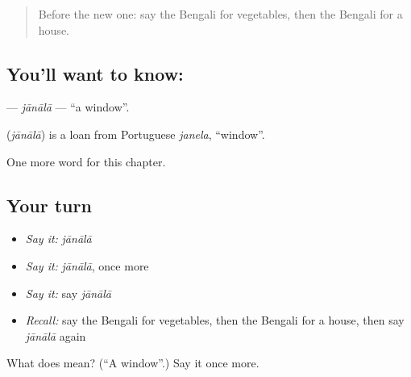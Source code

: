 \label{lesson:BN-C59-janala}



\begin{quote}
Before the new one: say the Bengali for vegetables, then the Bengali for a house.
\end{quote}

\subsection*{You'll want to know: }
\textbf{} — \emph{jānālā} — \textquotedblleft{}a window\textquotedblright{}.

\begin{cousinweb}
\textbf{} (\emph{jānālā}) is a loan from Portuguese \emph{janela}, \textquotedblleft{}window\textquotedblright{}.
\end{cousinweb}

\begin{grammarlens}[title={What you've built}]
One more word for this chapter.
\end{grammarlens}

\subsection*{Your turn}
\begin{itemize}
\raggedright
  \item \emph{Say it:} \emph{jānālā}
  \item \emph{Say it:} \emph{jānālā}, once more
  \item \emph{Say it:} say \emph{jānālā}
  \item \emph{Recall:} say the Bengali for vegetables, then the Bengali for a house, then say \emph{jānālā} again
\end{itemize}

\begin{tcolorbox}[breakable,colback=teal!4,colframe=teal!35!black,title={Before you move on}]
What does  mean? (\textquotedblleft{}A window\textquotedblright{}.) Say it once more.
\end{tcolorbox}
